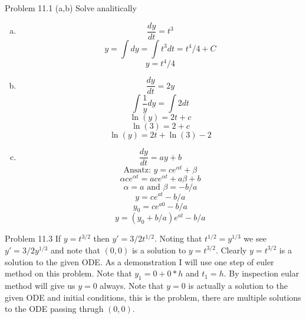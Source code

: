 \documentclass[12pt]{article}
\makeatletter
\theoremstyle{homework}
\newenvironment{exercise}[1]
{\def\@currentlabel{#1}\exercisecore}
{\endexercisecore}
\makeatother
\begin{document}
\begin{exercise}
4
Problem 11.1 (a,b)
\end{exercise}
Solve analitically
\begin{enumerate}[(a)]
\item
$$\frac{dy}{dt}=t^3$$
$$y=\int dy=\int t^3dt=t^4/4+C$$
$$y=t^4/4$$
\item
$$\frac{dy}{dt}=2y$$
$$\int \frac{1}{y} dy=\int 2 dt$$
$$\ln (y)=2t+c$$
$$\ln (3)=2+c$$
$$\ln (y)=2t+\ln (3)-2$$
\item
$$\frac{dy}{dt}=ay+b$$
$$\text{Ansatz: } y=ce^{\alpha t}+\beta$$
$$\alpha ce^{\alpha t} =ace^{\alpha t}+a\beta+b$$
$$\alpha=a\text{ and } \beta=-b/a$$
$$y=ce^{a t}-b/a$$
$$y_0=ce^{a 0}-b/a$$
$$y=(y_0+b/a)e^{a t}-b/a$$
\end{enumerate}

\begin{exercise}
5
Problem 11.3
\end{exercise}
If $y=t^{3/2}$ then $y'=3/2t^{1/2}$.  Noting that $t^{1/2}=y^{1/3}$ we see $y'=3/2y^{1/3}$ and note that $(0,0)$ is a solution to $y=t^{3/2}$.  Clearly $y=t^{3/2}$ is a solution to the given ODE.  As a demonstration I will use one step of euler method on this problem.  Note that $y_1=0+0*h$ and $t_1=h$.  By inspection eular method will give us $y=0$ always.  Note that $y=0$ is actually a solution to the given ODE and initial conditions, this is the problem, there are multiple solutions to the ODE passing thrugh $(0,0)$.
\end{document}
